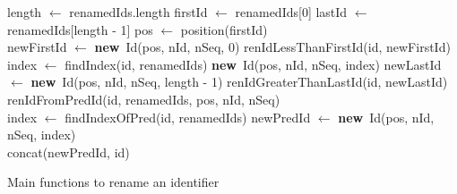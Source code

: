\documentclass[10pt,journal,compsoc]{IEEEtran}
\let\MYoriglatexcaption\caption
\renewcommand{\caption}[2][\relax]{\MYoriglatexcaption[#2]{#2}}
\newcommand{\new}{\textbf{new}}
\begin{document}
\begin{myalgorithm}[!ht]
    \footnotesize
    \begin{algorithmic}
            \State length $\gets$ renamedIds.length
            \State firstId $\gets$ renamedIds[0]
            \State lastId $\gets$ renamedIds[length - 1]
            \State pos $\gets$ position(firstId)
            \\
                \State newFirstId $\gets$ \new~Id(pos, nId, nSeq, 0)
                \State \Return renIdLessThanFirstId(id, newFirstId)
                \State index $\gets$ findIndex(id, renamedIds)
                \State \Return \new~Id(pos, nId, nSeq, index)
                \State newLastId $\gets$ \new~Id(pos, nId, nSeq, length - 1)
                \State \Return renIdGreaterThanLastId(id, newLastId)
            \Else
                \State \Return renIdFromPredId(id, renamedIds, pos, nId, nSeq)
            \EndIf
        \EndFunction
        \\
            \State index $\gets$ findIndexOfPred(id, renamedIds)
            \State newPredId $\gets$ \new~Id(pos, nId, nSeq, index)
            \\
            \State \Return concat(newPredId, id)
        \EndFunction
    \end{algorithmic}
    \caption{Main functions to rename an identifier}
    \label{alg:renameId}
\end{myalgorithm}
\end{document}

